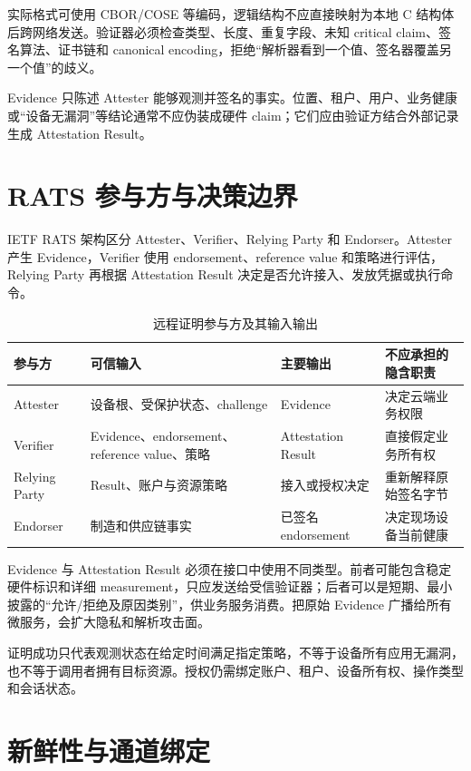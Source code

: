 实际格式可使用 CBOR/COSE 等编码，逻辑结构不应直接映射为本地 C 结构体后跨网络发送。验证器必须检查类型、长度、重复字段、未知 critical claim、签名算法、证书链和 canonical encoding，拒绝“解析器看到一个值、签名器覆盖另一个值”的歧义。

Evidence 只陈述 Attester 能够观测并签名的事实。位置、租户、用户、业务健康或“设备无漏洞”等结论通常不应伪装成硬件 claim；它们应由验证方结合外部记录生成 Attestation Result。

\section{RATS 参与方与决策边界}

IETF RATS 架构区分 Attester、Verifier、Relying Party 和 Endorser\cite{rfc9334-rats}。Attester 产生 Evidence，Verifier 使用 endorsement、reference value 和策略进行评估，Relying Party 再根据 Attestation Result 决定是否允许接入、发放凭据或执行命令。

\begin{table}[H]
  \centering
  \caption{远程证明参与方及其输入输出}
  \begin{tabular}{p{27mm}p{38mm}p{42mm}p{29mm}}
    \hline
    参与方 & 可信输入 & 主要输出 & 不应承担的隐含职责 \\
    \hline
    Attester & 设备根、受保护状态、challenge & Evidence & 决定云端业务权限 \\
    Verifier & Evidence、endorsement、reference value、策略 & Attestation Result & 直接假定业务所有权 \\
    Relying Party & Result、账户与资源策略 & 接入或授权决定 & 重新解释原始签名字节 \\
    Endorser & 制造和供应链事实 & 已签名 endorsement & 决定现场设备当前健康 \\
    \hline
  \end{tabular}
\end{table}

Evidence 与 Attestation Result 必须在接口中使用不同类型。前者可能包含稳定硬件标识和详细 measurement，只应发送给受信验证器；后者可以是短期、最小披露的“允许/拒绝及原因类别”，供业务服务消费。把原始 Evidence 广播给所有微服务，会扩大隐私和解析攻击面。

证明成功只代表观测状态在给定时间满足指定策略，不等于设备所有应用无漏洞，也不等于调用者拥有目标资源。授权仍需绑定账户、租户、设备所有权、操作类型和会话状态。

\section{新鲜性与通道绑定}


